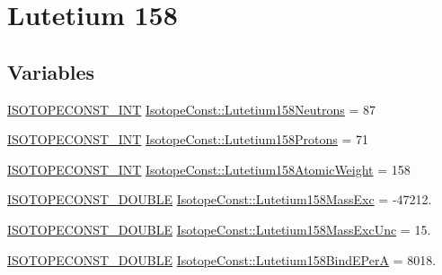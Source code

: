 \hypertarget{group___isotope_const-_lutetium-_lu158}{}\section{Lutetium 158}
\label{group___isotope_const-_lutetium-_lu158}
\subsection*{Variables}
\begin{DoxyCompactItemize}
\item 
\mbox{\hyperlink{group___isotope_const-_macros_ga5f18360b3e99483a35c32d789e62621c}{I\+S\+O\+T\+O\+P\+E\+C\+O\+N\+S\+T\+\_\+\+I\+NT}} \mbox{\hyperlink{group___isotope_const-_lutetium-_lu158_ga481dea106448b4df940371aa0dd7c3e0}{Isotope\+Const\+::\+Lutetium158\+Neutrons}} = 87
\item 
\mbox{\hyperlink{group___isotope_const-_macros_ga5f18360b3e99483a35c32d789e62621c}{I\+S\+O\+T\+O\+P\+E\+C\+O\+N\+S\+T\+\_\+\+I\+NT}} \mbox{\hyperlink{group___isotope_const-_lutetium-_lu158_ga47e8782450c405183d91f90633cace54}{Isotope\+Const\+::\+Lutetium158\+Protons}} = 71
\item 
\mbox{\hyperlink{group___isotope_const-_macros_ga5f18360b3e99483a35c32d789e62621c}{I\+S\+O\+T\+O\+P\+E\+C\+O\+N\+S\+T\+\_\+\+I\+NT}} \mbox{\hyperlink{group___isotope_const-_lutetium-_lu158_ga535325db920756d0d090fb67c3884d7b}{Isotope\+Const\+::\+Lutetium158\+Atomic\+Weight}} = 158
\item 
\mbox{\hyperlink{group___isotope_const-_macros_ga8f45a7272ce02c0b4c65c44636ed719a}{I\+S\+O\+T\+O\+P\+E\+C\+O\+N\+S\+T\+\_\+\+D\+O\+U\+B\+LE}} \mbox{\hyperlink{group___isotope_const-_lutetium-_lu158_ga5008222e3ab0ffd98f5446f3a28b42ee}{Isotope\+Const\+::\+Lutetium158\+Mass\+Exc}} = -\/47212.
\item 
\mbox{\hyperlink{group___isotope_const-_macros_ga8f45a7272ce02c0b4c65c44636ed719a}{I\+S\+O\+T\+O\+P\+E\+C\+O\+N\+S\+T\+\_\+\+D\+O\+U\+B\+LE}} \mbox{\hyperlink{group___isotope_const-_lutetium-_lu158_gaa4c09ac96b810bd100655731135d9962}{Isotope\+Const\+::\+Lutetium158\+Mass\+Exc\+Unc}} = 15.
\item 
\mbox{\hyperlink{group___isotope_const-_macros_ga8f45a7272ce02c0b4c65c44636ed719a}{I\+S\+O\+T\+O\+P\+E\+C\+O\+N\+S\+T\+\_\+\+D\+O\+U\+B\+LE}} \mbox{\hyperlink{group___isotope_const-_lutetium-_lu158_ga61527feaf0a3e6c555e59ff007a34682}{Isotope\+Const\+::\+Lutetium158\+Bind\+E\+PerA}} = 8018.
\item 

\end{DoxyCompactItemize}
